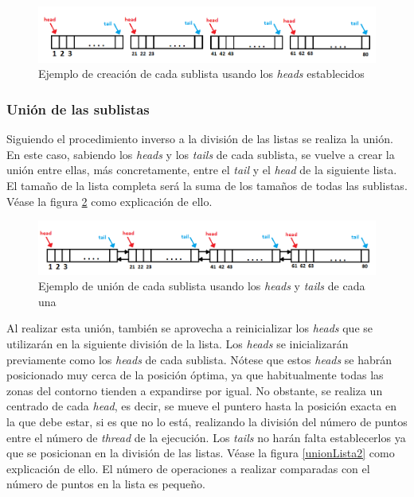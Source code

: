  \begin{figure}[H]
 	\captionsetup{justification=centering}
 	\centering
 	\includegraphics[width=1\textwidth]{./imagenes/divisionLista2}
 	\caption{Ejemplo de creaci\'{o}n de cada sublista usando los \textit{heads} establecidos}	
 	\label{divisionLista2}
 \end{figure} 
 
 
\subsubsection{Uni\'{o}n de las sublistas} 

Siguiendo el procedimiento inverso a la divisi\'{o}n de las listas se realiza la uni\'{o}n. En este caso, sabiendo los \textit{heads} y los \textit{tails} de cada sublista, se vuelve a crear la uni\'{o}n entre ellas, m\'{a}s concretamente, entre el \textit{tail} y el \textit{head} de la siguiente lista. El tama\~{n}o de la lista completa ser\'{a} la suma de los tama\~{n}os de todas las sublistas. V\'{e}ase la figura \ref{unionLista1} como explicaci\'{o}n de ello.

 \begin{figure}[H]
 	\captionsetup{justification=centering}
 	\centering
 	\includegraphics[width=1\textwidth]{./imagenes/unionLista1}
 	\caption{Ejemplo de uni\'{o}n de cada sublista usando los \textit{heads} y \textit{tails} de cada una}	
 	\label{unionLista1}
 \end{figure} 
 
Al realizar esta uni\'{o}n, tambi\'{e}n se aprovecha a reinicializar los \textit{heads} que se utilizar\'{a}n en la siguiente divisi\'{o}n de la lista. Los \textit{heads} se inicializar\'{a}n previamente como los \textit{heads} de cada sublista. N\'{o}tese que estos \textit{heads} se habr\'{a}n posicionado muy cerca de la posici\'{o}n \'{o}ptima, ya que habitualmente todas las zonas del contorno tienden a expandirse por igual. No obstante, se realiza un centrado de cada \textit{head}, es decir, se mueve el puntero hasta la posici\'{o}n exacta en la que debe estar, si es que no lo est\'{a}, realizando la divisi\'{o}n del n\'{u}mero de puntos entre el n\'{u}mero de \textit{thread} de la ejecuci\'{o}n. Los \textit{tails} no har\'{a}n falta establecerlos ya que se posicionan en la divisi\'{o}n de las listas. V\'{e}ase la figura \ref{unionLista2} como explicaci\'{o}n de ello. El n\'{u}mero de operaciones a realizar comparadas con el n\'{u}mero de puntos en la lista es peque\~{n}o.

